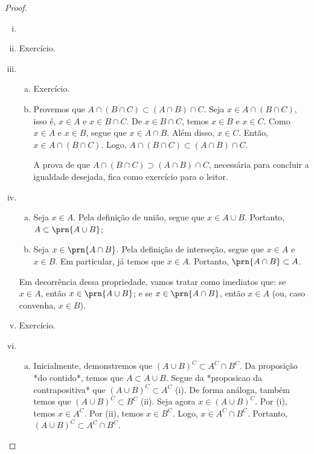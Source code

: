 \begin{proof}
\begin{enumerate}[i)]
    \item[]
    \item Exercício.
    \item
    \begin{enumerate}[a)]
        \item Exercício.
        \item
            Provemos que $A \cap (B \cap C) \subset (A \cap B) \cap C$. Seja $x \in A \cap (B \cap C)$, isso é, $x \in A$ e $x \in B \cap C$. De $x \in B \cap C$, temos $x \in B$ e $x \in C$. Como $x \in A$ e $x \in B$, segue que $x \in A \cap B$. Além disso, $x \in C$. Então, $x \in A \cap (B \cap C)$. Logo, $A \cap (B \cap C) \subset (A \cap B) \cap C$. 

            A prova de que $A \cap (B \cap C) \supset (A \cap B) \cap C$, necessária para concluir a igualdade desejada, fica como exercício para o leitor.
    \end{enumerate}

    \item 	

    \begin{enumerate}[a)]
        \item
            Seja $x \in A$. Pela definição de união, segue que $x \in A \cup B$. Portanto, $A \subset \prn{A \cup B}$;
        \item
            Seja $x \in \prn{A \cap B}$. Pela definição de interseção, segue que $x\in A$ e $x \in B$. 
        Em particular, já temos que $x \in A$. Portanto, $\prn{A \cap B} \subset A$.
    \end{enumerate}
    Em decorrência dessa propriedade, vamos tratar como imediatos que: 
    se $x \in A$, então $x \in \prn{A \cup B}$; 
    e se $x \in \prn{A \cap B}$, então $x\in A$ (ou, caso convenha, $x\in B$).

    \item Exercício.
    \item
    \begin{enumerate}[a)]
        \item
            Inicialmente, demonstremos que $(A \cup B)^C \subset A^C \cap B^C$. Da proposição *do contido*, temos que $A \subset A \cup B$. Segue da *proposicao da contrapositiva* que $(A \cup B)^C \subset A^C$ (i). De forma análoga, também temos que $(A \cup B)^C \subset B^C$ (ii). Seja agora $x \in (A \cup B)^C$. Por (i), temos $x \in A^C$. Por (ii), temos $x \in B^C$. Logo, $x \in A^C \cap B^C$. Portanto, $(A \cup B)^C \subset A^C \cap B^C$.


\end{enumerate}
\end{enumerate}
\end{proof}
